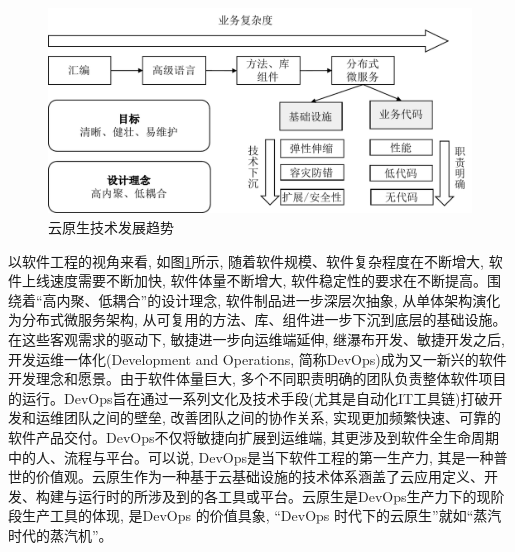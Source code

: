 \begin{figure}[h] %
    \centering %
    \includegraphics[width=0.9 \textwidth]{FIGs/chapter2/cloud_native_development.pdf} %
    \caption{云原生技术发展趋势} %
    \label{cloud_native_development} %
\end{figure}%

以软件工程的视角来看, 如图\ref{cloud_native_development}所示, 随着软件规模、软件复杂程度在不断增大, 软件上线速度需要不断加快, 软件体量不断增大,  软件稳定性的要求在不断提高。围绕着“高内聚、低耦合”的设计理念, 软件制品进一步深层次抽象, 从单体架构演化为分布式微服务架构, 从可复用的方法、库、组件进一步下沉到底层的基础设施。在这些客观需求的驱动下, 敏捷进一步向运维端延伸, 继瀑布开发、敏捷开发之后, 开发运维一体化(Development and Operations, 简称DevOps)成为又一新兴的软件开发理念和愿景。由于软件体量巨大, 多个不同职责明确的团队负责整体软件项目的运行。DevOps旨在通过一系列文化及技术手段(尤其是自动化IT工具链)打破开发和运维团队之间的壁垒, 改善团队之间的协作关系, 实现更加频繁快速、可靠的软件产品交付\cite{ChinaDevops}。DevOps不仅将敏捷向扩展到运维端, 其更涉及到软件全生命周期中的人、流程与平台。可以说, DevOps是当下软件工程的第一生产力, 其是一种普世的价值观。云原生作为一种基于云基础设施的技术体系涵盖了云应用定义、开发、构建与运行时的所涉及到的各工具或平台。云原生是DevOps生产力下的现阶段生产工具的体现, 是DevOps 的价值具象, “DevOps 时代下的云原生”就如“蒸汽时代的蒸汽机”。

